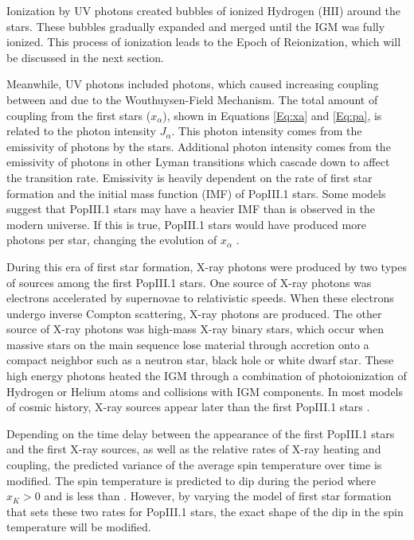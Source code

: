 
Ionization by UV photons created bubbles of ionized Hydrogen (HII) around the stars. These bubbles gradually expanded and merged until the IGM was fully ionized. This process of ionization leads to the Epoch of Reionization, which will be discussed in the next section.

Meanwhile, UV photons included \lya  photons, which caused increasing coupling between \ts and \tk due to the Wouthuysen-Field Mechanism. The total amount of coupling from the first stars ($x_\alpha$), shown in Equations \ref{Eq:xa} and \ref{Eq:pa}, is related to the \lya  photon intensity $J_\alpha$. This photon intensity comes from the emissivity of \lya photons by the stars. Additional photon intensity comes from the emissivity of photons in other Lyman transitions which cascade down to affect the \lya  transition rate. Emissivity is heavily dependent on the rate of first star formation and the initial mass function (IMF) of PopIII.1 stars. Some models suggest that PopIII.1 stars may have a heavier IMF than is observed in the modern universe. If this is true, PopIII.1 stars would have produced more \lya  photons per star, changing the evolution of $x_\alpha$ \cite{natarajan_2014}. 

During this era of first star formation, X-ray photons were produced by two types of sources among the first PopIII.1 stars. One source of X-ray photons was electrons accelerated by supernovae to relativistic speeds. When these electrons undergo inverse Compton scattering, X-ray photons are produced. The other source of X-ray photons was high-mass X-ray binary stars, which occur when massive stars on the main sequence lose material through accretion onto a compact neighbor such as a neutron star, black hole or white dwarf star. These high energy photons heated the IGM through a combination of photoionization of Hydrogen or Helium atoms and collisions with IGM components. In most models of cosmic history, X-ray sources appear later than the first PopIII.1 stars \cite{furlanetto_2006}. 

Depending on the time delay between the appearance of the first PopIII.1 stars and the first X-ray sources, as well as the relative rates of X-ray heating and \lya coupling, the predicted variance of the average spin temperature over time is modified. The spin temperature is predicted to dip during the period where $x_K>0$ and \tk is less than \tg. However, by varying the model of first star formation that sets these two rates for PopIII.1 stars, the exact shape of the dip in the spin temperature will be modified. 

